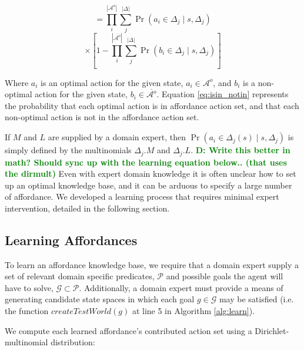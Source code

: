 \documentclass[conference]{IEEEtran}
\newcommand{\dnote}[1]{\textcolor{Green}{\textbf{D: #1}}}
\begin{document}
\begin{equation*}
= \prod_i^{|\mathcal{A}^o|} \sum_j^{|\Delta|} \Pr(a_i \in \Delta_j \mid s, \Delta_j)\end{equation*}
\begin{equation}
\times \left[1 - \prod_i^{|\overline{\mathcal{A}^o}|} \sum_j^{|\Delta|} \Pr(b_i \in \Delta_j \mid s, \Delta_j)\right]
\label{eq:isin_notin}
\end{equation}

Where $a_i$ is an optimal action for the given state, $a_i \in \mathcal{A}^o$,
and $b_i$ is a non-optimal action for the given state, $b_i \in \overline{\mathcal{A}^o}$.
Equation \ref{eq:isin_notin} represents the probability that each optimal action is in
affordance action set, and that each non-optimal action is not in the affordance action set.

If $M$ and $L$ are supplied by a domain expert, then 
$\Pr(a_i \in \Delta_j(s) \mid s, \Delta_j)$ is simply defined by the multinomials 
$\Delta_j.M$ and $\Delta_j.L$. \dnote{Write this better in math? Should sync 
up with the learning equation below.. (that uses the dirmult)} Even with expert 
domain knowledge it is often unclear how to set up an optimal knowledge base, 
and it can be arduous to specify a large number of affordance. We developed a 
learning process that requires minimal expert intervention, detailed in the following section.

\subsection{Learning Affordances}


To learn an affordance knowledge base, we require that a domain expert supply a set of relevant domain specific predicates,
$\mathcal{P}$ and possible goals the agent will have to solve, $\mathcal{G} \subset \mathcal{P}$. Additionally,
a domain expert must provide a means of generating candidate state spaces in which
each goal $g \in \mathcal{G}$ may be satisfied (i.e. the function $createTestWorld(g)$ at line 5 in Algorithm \ref{alg:learn}).

We compute each learned affordance's contributed action set using a Dirichlet-multinomial distribution:
\end{document}
